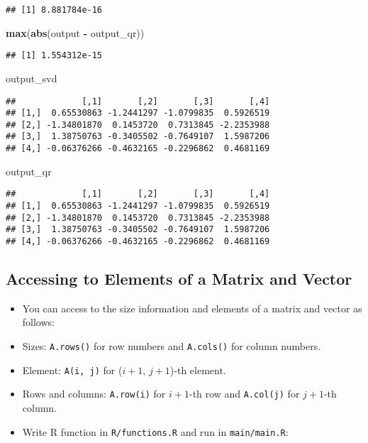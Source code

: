 \documentclass[
]{book}
\newenvironment{Shaded}{\begin{snugshade}}{\end{snugshade}}
\newcommand{\KeywordTok}[1]{\textcolor[rgb]{0.13,0.29,0.53}{\textbf{#1}}}
\newcommand{\NormalTok}[1]{#1}
\newcommand{\OperatorTok}[1]{\textcolor[rgb]{0.81,0.36,0.00}{\textbf{#1}}}
\newcommand{\StringTok}[1]{\textcolor[rgb]{0.31,0.60,0.02}{#1}}
\begin{document}
\begin{verbatim}
## [1] 8.881784e-16
\end{verbatim}

\begin{Shaded}
\begin{Highlighting}[]
\KeywordTok{max}\NormalTok{(}\KeywordTok{abs}\NormalTok{(output }\OperatorTok{-}\StringTok{ }\NormalTok{output_qr))}
\end{Highlighting}
\end{Shaded}

\begin{verbatim}
## [1] 1.554312e-15
\end{verbatim}

\begin{Shaded}
\begin{Highlighting}[]
\NormalTok{output_svd}
\end{Highlighting}
\end{Shaded}

\begin{verbatim}
##             [,1]       [,2]       [,3]       [,4]
## [1,]  0.65530863 -1.2441297 -1.0799835  0.5926519
## [2,] -1.34801870  0.1453720  0.7313845 -2.2353988
## [3,]  1.38750763 -0.3405502 -0.7649107  1.5987206
## [4,] -0.06376266 -0.4632165 -0.2296862  0.4681169
\end{verbatim}

\begin{Shaded}
\begin{Highlighting}[]
\NormalTok{output_qr}
\end{Highlighting}
\end{Shaded}

\begin{verbatim}
##             [,1]       [,2]       [,3]       [,4]
## [1,]  0.65530863 -1.2441297 -1.0799835  0.5926519
## [2,] -1.34801870  0.1453720  0.7313845 -2.2353988
## [3,]  1.38750763 -0.3405502 -0.7649107  1.5987206
## [4,] -0.06376266 -0.4632165 -0.2296862  0.4681169
\end{verbatim}

\hypertarget{accessing-to-elements-of-a-matrix-and-vector}{%
\subsection{Accessing to Elements of a Matrix and Vector}\label{accessing-to-elements-of-a-matrix-and-vector}}

\begin{itemize}
\item
  You can access to the size information and elements of a matrix and vector as follows:
\item
  Sizes: \texttt{A.rows()} for row numbers and \texttt{A.cols()} for column numbers.
\item
  Element: \texttt{A(i,\ j)} for (\(i + 1\), \(j + 1\))-th element.
\item
  Rows and columns: \texttt{A.row(i)} for \(i + 1\)-th row and \texttt{A.col(j)} for \(j + 1\)-th column.
\item
  Write R function in \texttt{R/functions.R} and run in \texttt{main/main.R}:
\end{itemize}
\end{document}
